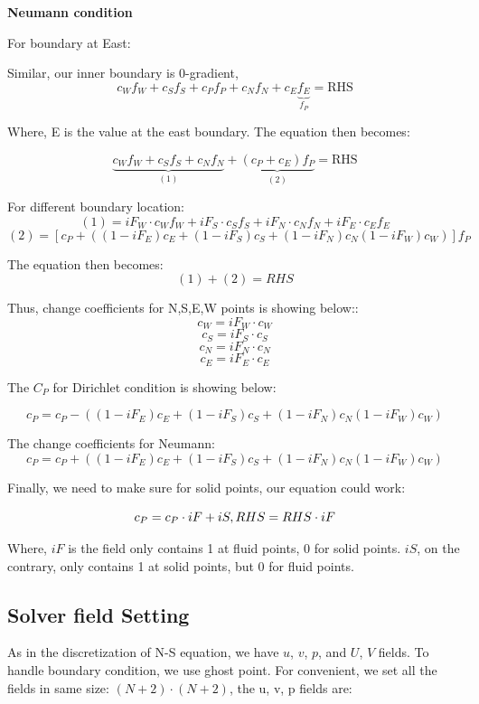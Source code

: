\documentclass[12pt]{article}
\begin{document}
\noindent \textbf{Neumann  condition} 

\noindent For boundary at East:

Similar, our inner boundary is 0-gradient,
\[
c_W f_W + c_S f_S + c_P f_P + c_N f_N + c_E\underbrace{ f_E}_{f_P} = \text{RHS}
\]


Where, E is the value at the east boundary. The equation then becomes:

\[
\underbrace{c_W f_W + c_S f_S+ c_N f_N}_{(1)}  + \underbrace{(c_P + c_E) f_P }_{(2)}
= 
\text{RHS} 
\]

\noindent For different boundary location:
$$
(1) = iF_W \cdot c_W f_W + iF_S \cdot c_S f_S + iF_N \cdot c_N f_N + iF_E \cdot c_E f_E
$$
$$
(2) = \left[ c_P + ((1-iF_E) c_E + (1-iF_S) c_S + (1-iF_N) c_N (1-iF_W) c_W) \right] f_P
$$



\noindent The equation then becomes:
$$
(1) + (2) = RHS
$$



\noindent Thus, change coefficients for N,S,E,W points is showing below::
\[
c_W = iF_W \cdot c_W
\]
\[
c_S = iF_S \cdot c_S
\]
\[
c_N = iF_N \cdot c_N
\]
\[
c_E = iF_E \cdot c_E
\]

The $C_P$ for Dirichlet condition is showing below:

\[
c_P = c_P - ((1-iF_E) c_E + (1-iF_S) c_S + (1-iF_N) c_N (1-iF_W) c_W)
\]

\noindent The change coefficients for Neumann:
\[
c_P = c_P + ((1-iF_E) c_E + (1-iF_S) c_S + (1-iF_N) c_N (1-iF_W) c_W)
\]

Finally, we need to make sure for solid points, our equation could work:

\[
c_P = c_P \cdot iF + iS, \vspace{15pt} RHS = RHS \cdot iF
\]

Where, $iF$ is the field only contains 1 at fluid points, 0 for solid points. $iS$, on the contrary, only contains 1 at solid points, but 0 for fluid points. 





\subsection{Solver field Setting}
As in the discretization of N-S equation, we have $u$, $v$, $p$, and $U$, $V$ fields. To handle boundary condition, we use ghost point. For convenient, we set all the fields in same size: $(N+2) \cdot (N+2)$, the u, v, p fields are:
\end{document}
